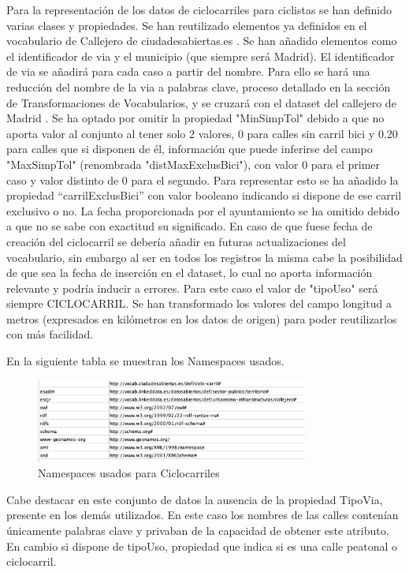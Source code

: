 Para la representación de los datos de ciclocarriles para ciclistas se han definido varias clases y propiedades. Se han reutilizado elementos ya definidos en el vocabulario de Callejero de ciudadesabiertas.es \cite{ciudadesbiertas_callejero}.
Se han añadido elementos como el identificador de via y el municipio (que siempre será Madrid).
El identificador de via se añadirá para cada caso a partir del nombre. Para ello se hará una reducción del nombre de la via a palabras clave, proceso detallado en la sección de Transformaciones de Vocabularios, y se cruzará con el dataset del callejero de Madrid \cite{datosmadrid_callejero}.
Se ha optado por omitir la propiedad "MinSimpTol" debido a que no aporta valor al conjunto al tener solo 2 valores, 0 para calles sin carril bici y 0.20 para calles que si disponen de él, información que puede inferirse del campo "MaxSimpTol" (renombrada "distMaxExclusBici"), con valor 0 para el primer caso y valor distinto de 0 para el segundo. Para representar esto se ha añadido la propiedad “carrilExclusBici” con valor booleano indicando si dispone de ese carril exclusivo o no.
La fecha proporcionada por el ayuntamiento se ha omitido debido a que no se sabe con exactitud su significado. En caso de que fuese fecha de creación del ciclocarril se debería añadir en futuras actualizaciones del vocabulario, sin embargo al ser en todos los registros la misma cabe la posibilidad de que sea la fecha de inserción en el dataset, lo cual no aporta información relevante y podría inducir a errores.
Para este caso el valor de "tipoUso" será siempre CICLOCARRIL.
Se han transformado los valores del campo longitud a metros (expresados en kilómetros en los datos de origen) para poder reutilizarlos con más facilidad.


\newpage
En la siguiente tabla se muestran los Namespaces usados.

\begin{figure}[h]
	\centering
		\includegraphics[angle=0, width=0.8\textwidth]{images/tablaIRIsCiclocarril.png}  
	\caption{Namespaces usados para Ciclocarriles}
\end{figure}




Cabe destacar en este conjunto de datos la ausencia de la propiedad TipoVia, presente en los demás utilizados. En este caso los nombres de las calles contenían únicamente palabras clave y privaban de la capacidad de obtener este atributo. En cambio si dispone de tipoUso, propiedad que indica si es una calle peatonal o ciclocarril.


